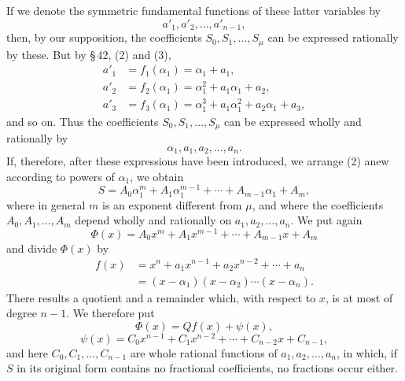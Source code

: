 \documentclass[11pt]{article}
\begin{document}
If we denote the symmetric fundamental functions of these latter variables by
\[
 a'_1,a'_2,\ldots,a'_{n-1},
\]
then, by our supposition, the coefficients \(S_0,S_1,\ldots,S_\mu\) can be expressed rationally by these. But by \S\,42, (2) and (3),
\[
\begin{aligned}
 a'_1&=f_1(\alpha_1)=\alpha_1+a_1,\\
 a'_2&=f_2(\alpha_1)=\alpha_1^2+a_1\alpha_1+a_2,\\
 a'_3&=f_3(\alpha_1)=\alpha_1^3+a_1\alpha_1^2+a_2\alpha_1+a_3,
\end{aligned}
\]
and so on. Thus the coefficients \(S_0,S_1,\ldots,S_\mu\) can be expressed wholly and rationally by
\[
 \alpha_1,a_1,a_2,\ldots,a_n.
\]
If, therefore, after these expressions have been introduced, we arrange (2) anew according to powers of \(\alpha_1\), we obtain
\begin{equation}
 S=A_0\alpha_1^m+A_1\alpha_1^{m-1}+\cdots+A_{m-1}\alpha_1+A_m,
\tag{3}
\end{equation}
where in general \(m\) is an exponent different from \(\mu\), and where the coefficients \(A_0,A_1,\ldots,A_m\) depend wholly and rationally on \(a_1,a_2,\ldots,a_n\). We put again
\begin{equation}
 \Phi(x)=A_0x^m+A_1x^{m-1}+\cdots+A_{m-1}x+A_m
\tag{4}
\end{equation}
and divide \(\Phi(x)\) by
\[
\begin{aligned}
 f(x)&=x^n+a_1x^{n-1}+a_2x^{n-2}+\cdots+a_n\\
     &=(x-\alpha_1)(x-\alpha_2)\cdots(x-\alpha_n).
\end{aligned}
\]
There results a quotient and a remainder which, with respect to \(x\), is at most of degree \(n-1\). We therefore put
\begin{equation}
 \Phi(x)=Qf(x)+\psi(x),
\tag{5}
\end{equation}
\begin{equation}
 \psi(x)=C_0x^{n-1}+C_1x^{n-2}+\cdots+C_{n-2}x+C_{n-1},
\tag{6}
\end{equation}
and here \(C_0,C_1,\ldots,C_{n-1}\) are whole rational functions of \(a_1,a_2,\ldots,a_n\), in which, if \(S\) in its original form contains no fractional coefficients, no fractions occur either.
\end{document}
